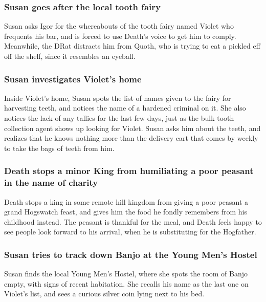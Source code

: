 \subsubsection{\Gls{Susan} goes after the local tooth fairy}
\Gls{Susan} asks \Gls{Igor} for the whereabouts of the tooth fairy named \Gls{Violet} who frequents
his bar, and is forced to use \Gls{Death}'s voice to get him to comply. Meanwhile, the \Gls{DRat}
distracts him from \Gls{Quoth}, who is trying to eat a pickled eff off the shelf, since it resembles
an eyeball.

\subsubsection{\Gls{Susan} investigates \Gls{Violet}'s home}
Inside \Gls{Violet}'s home, \Gls{Susan} spots the list of names given to the fairy for harvesting
teeth, and notices the name of a hardened criminal on it. She also notices the lack of any tallies
for the last few days, just as the bulk tooth collection agent shows up looking for \Gls{Violet}.
\Gls{Susan} asks him about the teeth, and realizes that he knows nothing more than the delivery
cart that comes by weekly to take the bags of teeth from him.

\subsubsection{\Gls{Death} stops a minor King from humiliating a poor peasant in the name of
    charity}
\Gls{Death} stops a king in some remote hill kingdom from giving a poor peasant a grand Hogswatch
feast, and gives him the food he fondly remembers from his childhood instead. The peasant is
thankful for the meal, and \Gls{Death} feels happy to see people look forward to his arrival, when
he is substituting for the Hogfather.

\subsubsection{\Gls{Susan} tries to track down \Gls{Banjo} at the Young Men's Hostel}
\Gls{Susan} finds the local Young Men's Hostel, where she spots the room of \Gls{Banjo} empty, with
signs of recent habitation. She recalls his name as the last one on \Gls{Violet}'s list, and sees a
curious silver coin lying next to his bed.

\subsection{}
